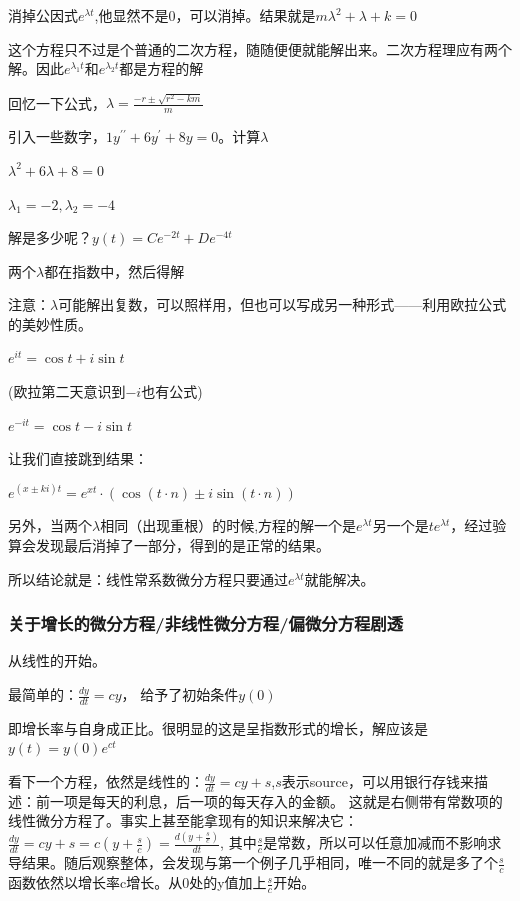 \documentclass[UTF8]{ctexbook}
\newcommand{\derivative}{^\prime}
\newcommand{\doubleDerivative}{^{\prime\prime}}
\begin{document}
{{{{消掉公因式$e^{\lambda t}$,他显然不是0，可以消掉。结果就是$m\lambda^2 + \lambda + k= 0$

这个方程只不过是个普通的二次方程，随随便便就能解出来。二次方程理应有两个解。因此$e^{\lambda_1 t}$和$e^{\lambda_2 t}$都是方程的解

回忆一下公式，$\lambda = \frac{-r \pm \sqrt{r^2 - km}}{m}$

引入一些数字，$1y\doubleDerivative + 6y\derivative + 8y = 0$。计算$\lambda$

$\lambda^2 + 6\lambda + 8 = 0$

$\lambda_1 = -2, \lambda_2 = -4$

解是多少呢？$y(t) = Ce^{-2t} + De^{-4t}$

两个$\lambda$都在指数中，然后得解

注意：$\lambda$可能解出复数，可以照样用，但也可以写成另一种形式——利用欧拉公式的美妙性质。

$e^{it} = \cos t + i\sin t$

(欧拉第二天意识到$-i$也有公式)

$e^{-it} = \cos t -i\sin t$

让我们直接跳到结果：

$e^{(x \pm ki)t} = e^{xt}\cdot(\cos(t\cdot n) \pm i\sin(t\cdot n))$

另外，当两个$\lambda$相同（出现重根）的时候,方程的解一个是$e^{\lambda t}$另一个是$te^{\lambda t}$，经过验算会发现最后消掉了一部分，得到的是正常的结果。

所以结论就是：线性常系数微分方程只要通过$e^{\lambda t}$就能解决。
}%

\subsubsection{关于增长的微分方程/非线性微分方程/偏微分方程剧透}{
  从线性的开始。

  最简单的：$\frac{dy}{dt} = cy$， 给予了初始条件$y(0)$

  即增长率与自身成正比。很明显的这是呈指数形式的增长，解应该是$y(t) = y(0)e^{ct}$

  看下一个方程，依然是线性的：$\frac{dy}{dt} = cy + s$,$s$表示source，可以用银行存钱来描述：前一项是每天的利息，后一项的每天存入的金额。
  这就是右侧带有常数项的线性微分方程了。事实上甚至能拿现有的知识来解决它：$\frac{dy}{dt} = cy + s = c(y + \frac{s}{c}) = \frac{d(y + \frac{s}{c})}{dt}$, 其中$\frac{s}{c}$是常数，所以可以任意加减而不影响求导结果。随后观察整体，会发现与第一个例子几乎相同，唯一不同的就是多了个$\frac{s}{c}$函数依然以增长率c增长。从0处的y值加上$\frac{s}{c}$开始。

}}}}
\end{document}
